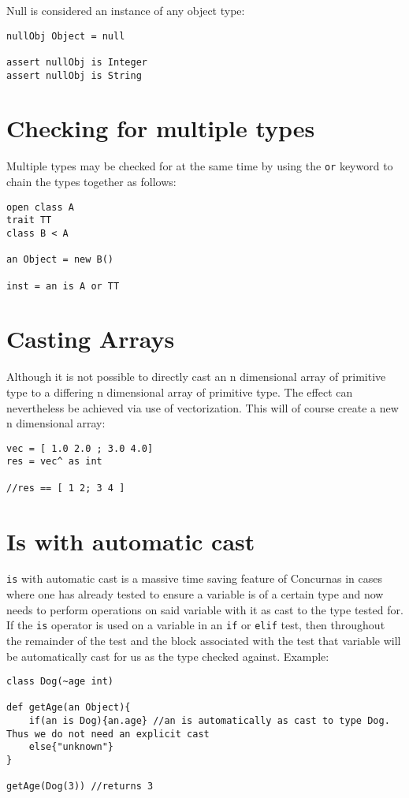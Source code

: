 \documentclass[conc-doc]{subfiles}
\begin{document}
Null is considered an instance of any object type:
\begin{lstlisting}
nullObj Object = null

assert nullObj is Integer
assert nullObj is String
\end{lstlisting}

\section{Checking for multiple types}
Multiple types may be checked for at the same time by using the \lstinline{or} keyword to chain the types together as follows:
\begin{lstlisting}
open class A
trait TT
class B < A

an Object = new B()

inst = an is A or TT
\end{lstlisting}

\section{Casting Arrays}
Although it is not possible to directly cast an n dimensional array of primitive type to a differing n dimensional array of primitive type. The effect can nevertheless be achieved via use of vectorization. This will of course create a new n dimensional array:
\begin{lstlisting}
vec = [ 1.0 2.0 ; 3.0 4.0]
res = vec^ as int

//res == [ 1 2; 3 4 ]
\end{lstlisting}

\section{Is with automatic cast}
\lstinline{is} with automatic cast is a massive time saving feature of Concurnas in cases where one has already tested to ensure a variable is of a certain type and now needs to perform operations on said variable with it as cast to the type tested for. If the \lstinline{is} operator is used on a variable in an \lstinline{if} or \lstinline{elif} test, then throughout the remainder of the test and the block associated with the test that variable will be automatically cast for us as the type checked against. Example:
\begin{lstlisting}
class Dog(~age int)

def getAge(an Object){
	if(an is Dog){an.age} //an is automatically as cast to type Dog. Thus we do not need an explicit cast
	else{"unknown"}
}

getAge(Dog(3)) //returns 3
\end{lstlisting}
\end{document}
